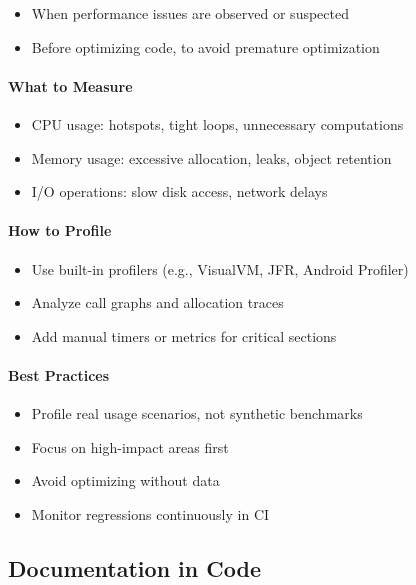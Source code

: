 \documentclass[a4paper,12pt]{article}
\begin{document}
\begin{itemize}
  \item When performance issues are observed or suspected
  \item Before optimizing code, to avoid premature optimization
\end{itemize}

\paragraph{What to Measure}

\begin{itemize}
  \item CPU usage: hotspots, tight loops, unnecessary computations
  \item Memory usage: excessive allocation, leaks, object retention
  \item I/O operations: slow disk access, network delays
\end{itemize}

\paragraph{How to Profile}

\begin{itemize}
  \item Use built-in profilers (e.g., VisualVM, JFR, Android Profiler)
  \item Analyze call graphs and allocation traces
  \item Add manual timers or metrics for critical sections
\end{itemize}

\paragraph{Best Practices}

\begin{itemize}
  \item Profile real usage scenarios, not synthetic benchmarks
  \item Focus on high-impact areas first
  \item Avoid optimizing without data
  \item Monitor regressions continuously in CI
\end{itemize}

\subsection{Documentation in Code}
\end{document}
